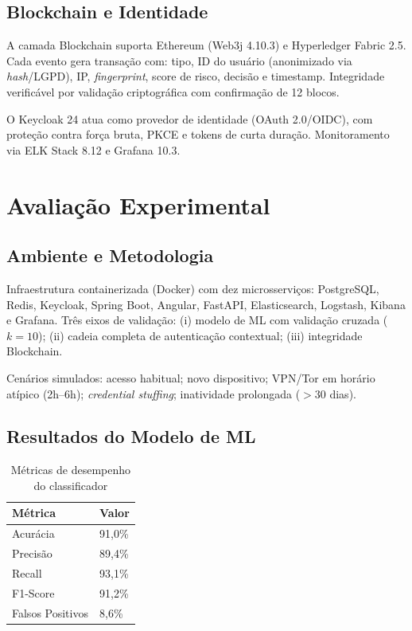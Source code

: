\documentclass[sigconf,nonacm]{acmart}
\begin{document}
\subsection{Blockchain e Identidade}

A camada Blockchain suporta Ethereum (Web3j 4.10.3) e Hyperledger Fabric 2.5. Cada evento gera transação com: tipo, ID do usuário (anonimizado via \textit{hash}/LGPD), IP, \textit{fingerprint}, score de risco, decisão e timestamp. Integridade verificável por validação criptográfica com confirmação de 12 blocos.

O Keycloak 24 atua como provedor de identidade (OAuth 2.0/OIDC), com proteção contra força bruta, PKCE e tokens de curta duração. Monitoramento via ELK Stack 8.12 e Grafana 10.3.

\section{Avaliação Experimental}

\subsection{Ambiente e Metodologia}

Infraestrutura containerizada (Docker) com dez microsserviços: PostgreSQL, Redis, Keycloak, Spring Boot, Angular, FastAPI, Elasticsearch, Logstash, Kibana e Grafana. Três eixos de validação: (i) modelo de ML com validação cruzada ($k=10$); (ii) cadeia completa de autenticação contextual; (iii) integridade Blockchain.

Cenários simulados: acesso habitual; novo dispositivo; VPN/Tor em horário atípico (2h--6h); \textit{credential stuffing}; inatividade prolongada ($>$30 dias).

\subsection{Resultados do Modelo de ML}

\begin{table}[H]
\caption{Métricas de desempenho do classificador}
\label{tab:ml}
\small
\begin{tabular}{@{}ll@{}}
\toprule
Métrica & Valor \\
\midrule
Acurácia & 91,0\% \\
Precisão & 89,4\% \\
Recall   & 93,1\% \\
F1-Score & 91,2\% \\
Falsos Positivos & 8,6\% \\
\bottomrule
\end{tabular}
\end{table}
\end{document}
